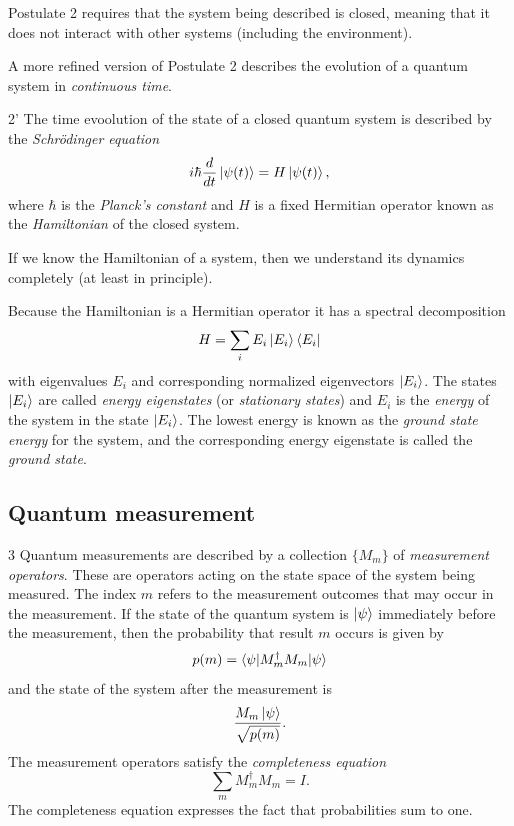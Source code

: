 Postulate 2 requires that the system being described is closed,
meaning that it does not interact with other systems (including the environment).

A more refined version of Postulate 2 describes the evolution of a quantum system in \emph{continuous time}.

\begin{postulate}{2'}
    The time evoolution of the state of a closed quantum system is described by the \emph{Schrödinger equation}
    \[
        i\hbar \frac{d}{dt}\ket{\psi(t)} = H\ket{\psi(t)},
    \]
    where $\hbar$ is the \emph{Planck's constant} and $H$ is a fixed Hermitian operator known as the \emph{Hamiltonian} of the closed system.
\end{postulate}

If we know the Hamiltonian of a system,
then we understand its dynamics completely (at least in principle).

Because the Hamiltonian is a Hermitian operator it has a spectral decomposition
\[
    H = \sum_i E_i \ket{E_i}\bra{E_i}
\]
with eigenvalues $E_i$ and corresponding normalized eigenvectors $\ket{E_i}$.
The states $\ket{E_i}$ are called \emph{energy eigenstates}
(or \emph{stationary states})
and $E_i$ is the \emph{energy} of the system in the state $\ket{E_i}$.
The lowest energy is known as the \emph{ground state energy} for the system,
and the corresponding energy eigenstate is called the \emph{ground state}.

\subsection{Quantum measurement}

\begin{postulate}[Measurement]{3}
    Quantum measurements are described by a collection $\{M_m\}$ of \emph{measurement operators}.
    These are operators acting on the state space of the system being measured.
    The index $m$ refers to the measurement outcomes that may occur in the measurement.
    If the state of the quantum system is $\ket{\psi}$ immediately before the measurement,
    then the probability that result $m$ occurs is given by
    \[
        p(m) = \braket{\psi|M_m^\dagger M_m|\psi}
    \]
    and the state of the system after the measurement is
    \[
        \frac{M_m\ket{\psi}}{\sqrt{p(m)}}.
    \]
    The measurement operators satisfy the \emph{completeness equation}
    \[
        \sum_m M_m^\dagger M_m = I.
    \]
    The completeness equation expresses the fact that probabilities sum to one.
\end{postulate}

